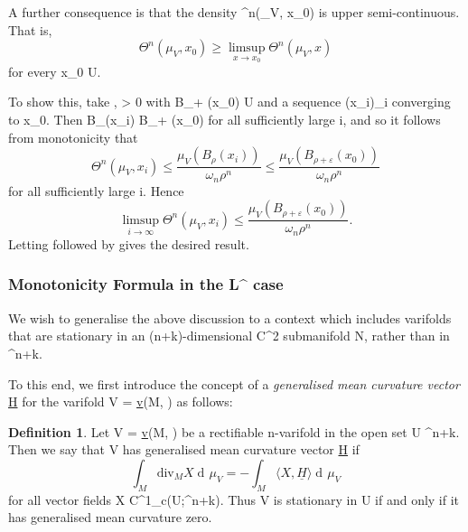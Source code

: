 \documentclass[a4paper, 11pt]{article}
\theoremstyle{plain}
\theoremstyle{definition}
\newtheorem{definition}[theorem]{Definition}
\theoremstyle{remark}
\DeclareMathOperator{\diff}{d \!}
\renewcommand{\div}{\text{div}} %
\numberwithin{equation}{subsection}
\def\({}
\def\){}
\begin{document}
A further consequence is that the density \(\Theta^{n}(\mu_V, x_0)\) is upper semi-continuous. That is,
\begin{equation}
\Theta^{n}(\mu_V, x_0) \geqslant \limsup_{x \rightarrow x_0} \Theta^{n}(\mu_V, x)
\end{equation}
for every \(x_0 \in U\).

To show this, take \(\rho, \varepsilon > 0\) with \(B_{\rho + \varepsilon}(x_0) \subset U\) and a sequence \((x_i)_{i}\) converging to \(x_0\). Then \(B_{\rho}(x_i) \subset B_{\rho + \varepsilon}(x_0)\) for all sufficiently large \(i\), and so it follows from monotonicity that
\begin{equation}
\Theta^{n}(\mu_V, x_i) \leqslant \frac{\mu_V(B_{\rho}(x_i))}{\omega_{n}\rho^{n}} \leqslant \frac{\mu_V(B_{\rho + \varepsilon}(x_0))}{\omega_{n}\rho^{n}}
\end{equation}
for all sufficiently large \(i\). Hence
\begin{equation}
\limsup_{i \rightarrow \infty} \Theta^{n}(\mu_V, x_i) \leqslant \frac{\mu_V(B_{\rho + \varepsilon}(x_0))}{\omega_{n}\rho^{n}}.
\end{equation}
Letting \(\varepsilon {}\) followed by \(\rho {}\) gives the desired result.

\subsubsection{Monotonicity Formula in the \texorpdfstring{\(L^{\infty}\)}{L-infinity} case}

We wish to generalise the above discussion to a context which includes varifolds that are stationary in an \((n+k)\)-dimensional \(C^2\) submanifold \(N\), rather than in \(^{n+k}\).

To this end, we first introduce the concept of a \emph{generalised mean curvature vector} \(\underline{H}\) for the varifold \(V = \underline{v}(M, \theta)\) as follows:

\begin{definition}
Let \(V = \underline{v}(M, \theta)\) be a rectifiable \(n\)-varifold in the open set \(U \subset {}^{n+k}\). Then we say that \(V\) has generalised mean curvature vector \(\underline{H}\) if
\begin{equation}
\int_{M}\div_{M}X \diff\mu_V = -\int_{M} \langle X, \underline{H} \rangle \diff\mu_V
\end{equation}
for all vector fields \(X \in C^{1}_{c}(U;^{n+k})\). Thus \(V\) is stationary in \(U\) if and only if it has generalised mean curvature zero.
\end{definition}
\end{document}

